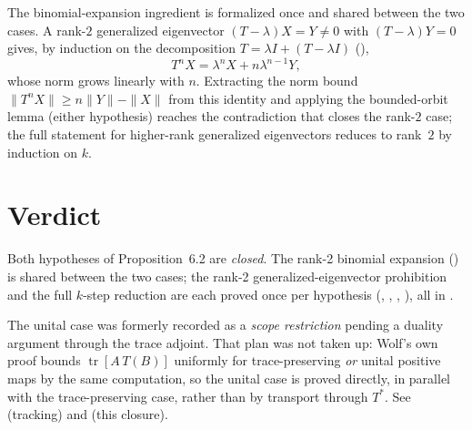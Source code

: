 \documentclass{article}
\begin{document}
The binomial-expansion ingredient is formalized once and shared between the
two cases. A rank-$2$ generalized eigenvector $(T-\lambda)X=Y\neq0$ with
$(T-\lambda)Y=0$ gives, by induction on the decomposition
$T=\lambda I+(T-\lambda I)$ (),
\[
    T^n X = \lambda^n X + n\lambda^{n-1}Y,
\]
whose norm grows linearly with $n$. Extracting the norm bound
$\|T^n X\|\ge n\|Y\|-\|X\|$ from this identity and applying the bounded-orbit
lemma (either hypothesis) reaches the contradiction that closes the rank-$2$
case; the full statement for higher-rank generalized eigenvectors reduces to
rank~$2$ by induction on $k$.

\section{Verdict}

Both hypotheses of Proposition~6.2 are \emph{closed}.  The rank-2 binomial
expansion () is shared
between the two cases; the rank-2 generalized-eigenvector prohibition and
the full $k$-step reduction are each proved once per hypothesis
(,
,
,
), all in
.

The unital case was formerly recorded as a \emph{scope restriction} pending a
duality argument through the trace adjoint. That plan was not taken up:
Wolf's own proof bounds $\operatorname{tr}[A\,T(B)]$ uniformly for
trace-preserving \emph{or} unital positive maps by the same computation, so
the unital case is proved directly, in parallel with the trace-preserving
case, rather than by transport through $T^*$. See 
(tracking) and  (this closure).



\end{document}
